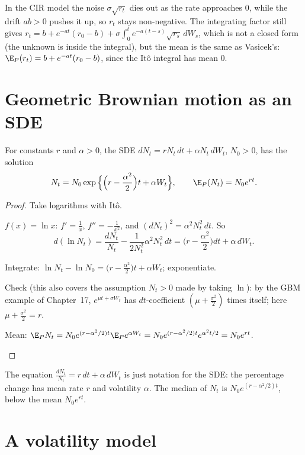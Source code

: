 In the CIR model the noise $\sigma\sqrt{r_t}$ dies out as the rate approaches $0$, while the drift $ab>0$ pushes it up, so $r_t$ stays non-negative. The integrating factor still gives $r_t=b+e^{-at}(r_0-b)+\sigma\int_0^te^{-a(t-s)}\sqrt{r_s}\,dW_s$, which is not a closed form (the unknown is inside the integral), but the mean is the same as Vasicek's: $\E_P(r_t)=b+e^{-at}(r_0-b)$, since the Itô integral has mean $0$.

\section{Geometric Brownian motion as an SDE}

\begin{theorem}
\label{thm:gbm-sde}
For constants $r$ and $\alpha>0$, the SDE $dN_t=rN_t\,dt+\alpha N_t\,dW_t$, $N_0>0$, has the solution
\[
  N_t=N_0\exp\Big\{\Big(r-\frac{\alpha^2}2\Big)t+\alpha W_t\Big\},\qquad \E_P(N_t)=N_0e^{rt}.
\]
\end{theorem}
\begin{proof}
Take logarithms with Itô.
\begin{steps}
  \item $f(x)=\ln x$: $f'=\frac1x$, $f''=-\frac1{x^2}$, and $(dN_t)^2=\alpha^2N_t^2\,dt$. So
  \[
    d(\ln N_t)=\frac{dN_t}{N_t}-\frac{1}{2N_t^2}\alpha^2N_t^2\,dt=\Big(r-\frac{\alpha^2}2\Big)dt+\alpha\,dW_t .
  \]
  \item Integrate: $\ln N_t-\ln N_0=\big(r-\frac{\alpha^2}{2}\big)t+\alpha W_t$; exponentiate.
  \item Check (this also covers the assumption $N_t>0$ made by taking $\ln$): by the GBM example of Chapter~17, $e^{\mu t+\sigma W_t}$ has $dt$-coefficient $(\mu+\frac{\sigma^2}{2})$ times itself; here $\mu+\frac{\sigma^2}2=r$.
  \item Mean: $\E_PN_t=N_0e^{(r-\alpha^2/2)t}\E_Pe^{\alpha W_t}=N_0e^{(r-\alpha^2/2)t}e^{\alpha^2t/2}=N_0e^{rt}$. \qedhere
\end{steps}
\end{proof}

The equation $\frac{dN_t}{N_t}=r\,dt+\alpha\,dW_t$ is just notation for the SDE: the percentage change has mean rate $r$ and volatility $\alpha$. The median of $N_t$ is $N_0e^{(r-\alpha^2/2)t}$, below the mean $N_0e^{rt}$.

\section{A volatility model}

